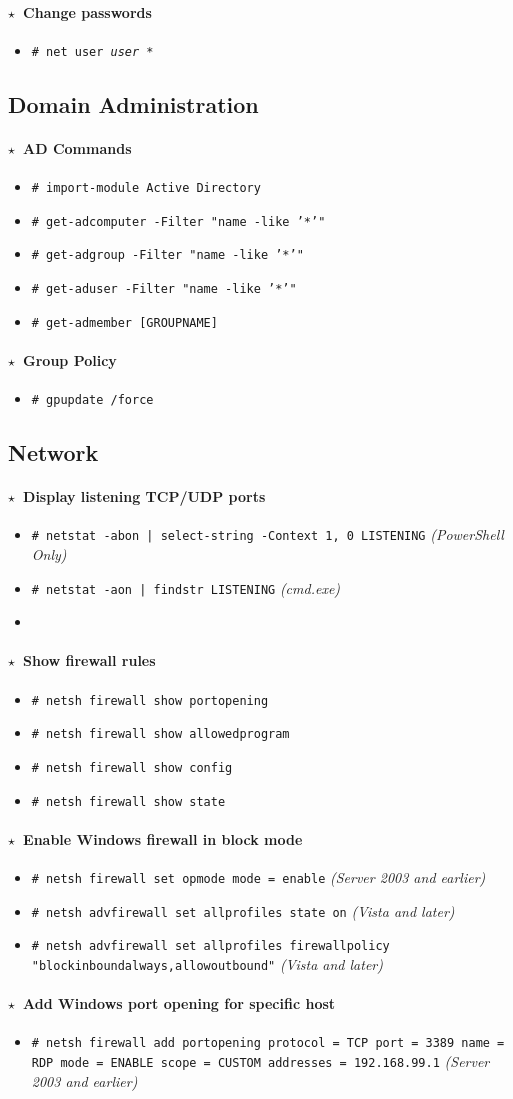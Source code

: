 \documentclass[10pt,landscape]{article}
\newcommand{\os}[1]{\texttt{\footnotesize{#1}}}
\newcommand{\windows}{\os{W}}
\newenvironment{action}[1]
  {\paragraph{$\star$~#1}\begin{itemize}[leftmargin=1cm]}
  {\end{itemize}}
\newcommand{\cmd}[2]{\item[#1] {\small\tt\# #2}}
\newcommand{\tool}[2]{\item[#1] {\footnotesize\sc{#2}}\xspace}
\begin{document}
\begin{multicols*}{3}
\begin{action}{Change passwords}
\cmd{\windows}{net user \emph{user} *}
\end{action}

\subsection*{Domain Administration}
\begin{action}{AD Commands}
\cmd{\windows}{import-module Active Directory}
\cmd{\windows}{get-adcomputer -Filter "name -like '*'"}
\cmd{\windows}{get-adgroup -Filter "name -like '*'"}
\cmd{\windows}{get-aduser -Filter "name -like '*'"}
\cmd{\windows}{get-admember  [GROUPNAME]}
\end{action}

\begin{action}{Group Policy}
\cmd{\windows}{gpupdate /force}
\end{action}


\subsection*{Network}

\begin{action}{Display listening TCP/UDP ports}
\cmd{\windows}{netstat -abon | select-string -Context 1, 0 LISTENING} \emph{(PowerShell Only)}
\cmd{\windows}{netstat -aon | findstr LISTENING} \emph{(cmd.exe)}
\tool{\windows}{tcpview}
\end{action}

\begin{action}{Show firewall rules}
\cmd{\windows}{netsh firewall show portopening}
\cmd{\windows}{netsh firewall show allowedprogram}
\cmd{\windows}{netsh firewall show config}
\cmd{\windows}{netsh firewall show state}
\end{action}

\begin{action}{Enable Windows firewall in block mode}
    \cmd{\windows}{netsh firewall set opmode mode = enable} \emph{(Server 2003 and earlier)}
    \cmd{\windows}{netsh advfirewall set allprofiles state on} \emph{(Vista and later)}
    \cmd{\windows}{netsh advfirewall set allprofiles firewallpolicy "blockinboundalways,allowoutbound"} \emph{(Vista and later)}
\end{action}

\begin{action}{Add Windows port opening for specific host}
\cmd{\windows}{netsh firewall add portopening protocol = TCP port = 3389 name = RDP mode = ENABLE scope = CUSTOM addresses = 192.168.99.1} \emph{(Server 2003 and earlier)}
\end{action}


\end{multicols*}
\end{document}
